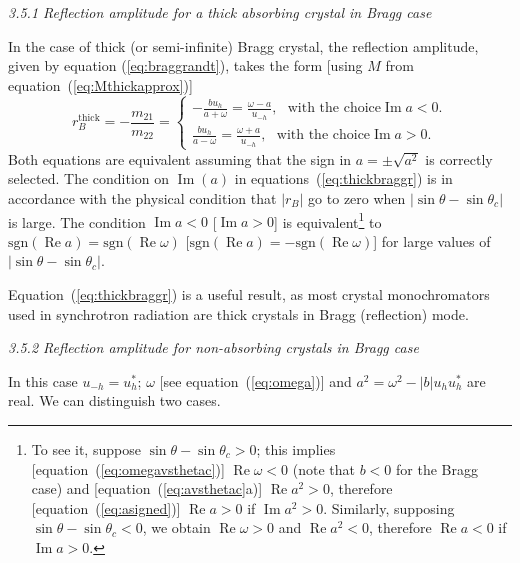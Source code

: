 \documentclass{iucr}
\begin{document}
\textit{3.5.1  Reflection amplitude for a thick absorbing crystal in Bragg case}

In the case of thick (or semi-infinite) Bragg crystal, the reflection amplitude, given by equation (\ref{eq:braggrandt}), takes the form [using $M$ from equation~(\ref{eq:Mthickapprox})]
\begin{equation}\label{eq:thickbraggr}
    r_B^{\text{thick}} = -\frac{m_{21}}{m_{22}} =
    \begin{cases} 
    -\frac{b u_h}{a+\omega}=\frac{\omega-a}{u_{-h}}, ~~~ \text{with the choice} \operatorname{Im} a <0.
    \\
    \frac{b u_h}{a-\omega} = \frac{\omega+a}{u_{-h}}, ~~~ \text{with the choice} \operatorname{Im} a>0.
    \end{cases}
\end{equation}
Both equations are equivalent assuming that the sign in $a=\pm \sqrt{a^2}$ is correctly selected. The condition on $\operatorname{Im}(a)$ in equations~(\ref{eq:thickbraggr}) is in accordance with the physical condition that $|r_B|$ go to zero when $|\sin\theta-\sin\theta_c|$ is large.
The condition $\operatorname{Im} a < 0$ [$\operatorname{Im} a > 0$] is equivalent\footnote{
To see it, suppose $\sin\theta-\sin\theta_c>0$; this implies [equation~(\ref{eq:omegavsthetac})] $\operatorname{Re}\omega<0$ (note that $b<0$ for the Bragg case) and 
[equation~(\ref{eq:avsthetac}a)] $\operatorname{Re}a^2>0$, therefore [equation~(\ref{eq:asigned})] $\operatorname{Re}a>0$ if $\operatorname{Im}a^2>0$. 
Similarly, supposing $\sin\theta-\sin\theta_c<0$, we obtain $\operatorname{Re}\omega>0$ and $\operatorname{Re}a^2<0$, therefore $\operatorname{Re}a<0$ if $\operatorname{Im}a>0$. 
}
to $\text{sgn}(\operatorname{Re}a)=\text{sgn}(\operatorname{Re}\omega)$ [$\text{sgn}(\operatorname{Re}a)=-\text{sgn}(\operatorname{Re}\omega)$] for large values of $|\sin\theta-\sin\theta_c|$.
 
Equation~(\ref{eq:thickbraggr}) is a useful result, as most crystal monochromators used in synchrotron radiation are thick crystals in Bragg (reflection) mode. 


\textit{3.5.2  Reflection amplitude for non-absorbing crystals in Bragg case}

In this case $u_{-h}=u^*_h$; $\omega$ [see equation~(\ref{eq:omega})] and $a^2=\omega^2-|b| u_h u_{h}^*$ are real. We can distinguish two cases. 
\end{document}
